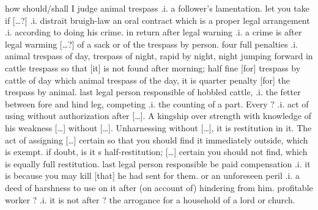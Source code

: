 \documentclass[11pt]{article}
\begin{document}
\begin{pages}
 \begin{Rightside}
    \beginnumbering
    \pstart  
    how should/shall I judge animal trespass .i. a follower's lamentation.  let you take if [\ldots?] .i. distrait bruigh-law an oral contract which is a proper legal arrangement .i. according to doing his crime.  in return after legal warning .i. a crime is after legal warming [\ldots?] of a sack or of the trespass by person.  four full penalties .i. animal trespass of day, trespass of night, rapid by night, night jumping forward in cattle trespass so that [it] is not found after morning;  half fine [for] trespass by cattle of day which animal trespass of the day, it is quarter penalty [for] the trespass by animal.  last legal person responsible of hobbled cattle, .i. the fetter between fore and hind leg, competing .i. the counting of a part. Every ? .i. act of using without authorization after [\ldots]. A kingship over strength with knowledge of his weakness [\ldots] without [\ldots].  Unharnessing without [\ldots], it is restitution in it.  The act of assigning [\ldots] certain so that you should find it immediately outside, which is exempt.  if doubt, is it s half-restitution; [\ldots] certain you should not find, which is equally full restitution.  last legal person responsible be paid compensation .i. it is because you may kill [that] he had sent for them.  or an unforeseen peril .i. a deed of harshness to use on it after (on account of) hindering from him. profitable worker ? .i. it is not after ? the arrogance for a household of a lord or church.
    \pend

   \endnumbering
  \end{Rightside}
  \Pages


\end{pages}
\end{document}
